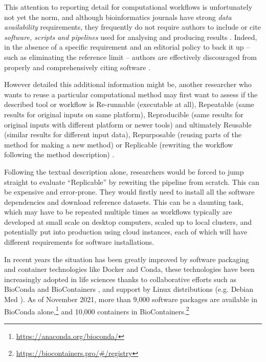 \documentclass[ds,v1.1.2,openaccess]{iosart2x}%
\begin{document}
This attention to reporting detail for computational workflows is
unfortunately not yet the norm, and although bioinformatics journals
have strong \textit{data availability} requirements, they frequently do not
require authors to include or cite \textit{software, scripts and pipelines}
used for analysing and producing results \cite{soilandreyes_tweet_2020}.
Indeed, in the absence of a specific requirement and an editorial
policy to back it up -- such as eliminating the reference limit --
authors are effectively discouraged from properly and comprehensively
citing software \cite{doi:10.1038/s41592-019-0350-x}.

However detailed this additional information might be, another
researcher who wants to reuse a particular computational method may
first want to assess if the described tool or workflow is Re-runnable
(executable at all), Repeatable (same results for original inputs on
same platform), Reproducible (same results for original inputs with
different platform or newer tools) and ultimately Reusable (similar
results for different input data), Repurposable (reusing parts of the
method for making a new method) or Replicable (rewriting the workflow
following the method description)
\cite{doi:10.3389/fninf.2017.00069,goble_presentation_2016}.

Following the textual description alone, researchers would be forced to
jump straight to evaluate ``Replicable'' by rewriting the pipeline from
scratch. This can be expensive and error-prone. They would firstly need
to install all the software dependencies and download reference
datasets. This can be a daunting task, which may have to be repeated
multiple times as workflows typically are developed at small scale on
desktop computers, scaled up to local clusters, and potentially put
into production using cloud instances, each of which will have
different requirements for software installations.

In recent years the situation has been greatly improved by software
packaging and container technologies like Docker and Conda, these
technologies have been increasingly adopted in life sciences
\cite{doi:10.1007/s41019-017-0050-4} thanks to collaborative efforts such
as BioConda \cite{doi:10.1038/s41592-018-0046-7} and BioContainers
\cite{doi:10.1093/bioinformatics/btx192}, and support by Linux
distributions (e.g. Debian Med \cite{doi:10.1186/1471-2105-11-S12-S5}). As
of November 2021, more than 9,000 software packages are available in
BioConda alone,\footnote{\url{https://anaconda.org/bioconda/}} and 10,000 containers
in BioContainers.\footnote{\url{https://biocontainers.pro/\#/registry}}
\end{document}
